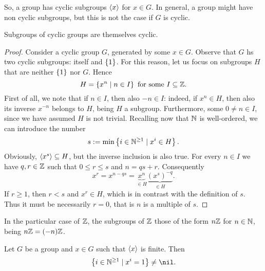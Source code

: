 
So, a group has cyclic subgroups \(\left\langle x\right\rangle\) for \(x \in G\). In general, a group might have non cyclic subgroups, but this is not the case if \(G\) is cyclic.

\begin{proposition}\label{prop:SubgroupsOfCyclicGroupsAreCyclic}
Subgroups of cyclic groups are themselves cyclic.
\end{proposition}

\begin{proof}
Consider a cyclic group \(G\), generated by some \(x \in G\). Observe that \(G\) hs two cyclic subgroups: itself and \(\left\{1\right\}\). For this reason, let us focus on subgroups \(H\) that are neither \(\left\{1\right\}\) nor \(G\). Hence
\[H = \left\{x^n \mid n \in I\right\} \text{ for some } I \subseteq \mathbb Z .\]
First of all, we note that if \(n \in I\), then also \(-n \in I\): indeed, if \(x^n \in H\), then also its inverse \(x^{-n}\) belongs to \(H\), being \(H\) a subgroup. Furthermore, some \(0 \ne n \in I\), since we have assumed \(H\) is not trivial. Recalling now that \(\mathbb N\) is well-ordered, we can introduce the number
\[s := \min \left\{i \in \mathbb N^{\ge 1} \mid x^i \in H\right\} .\]
Obviously, \(\left\langle x^s\right\rangle \subseteq H\), but the inverse inclusion is also true. For every \(n \in I\) we have \(q, r \in \mathbb Z\) such that \(0 \le r \le s\) and \(n =qs +r\). Consequently
\[x^r = x^{n-qs} = \underbrace{x^n}_{\in H} \underbrace{(x^s)^{-q}}_{\in H} .\]
If \(r \ge 1\), then \(r < s\) and \(x^r \in H\), which is in contrast with the definition of \(s\). Thus it must be necessarily \(r = 0\), that is \(n\) is a multiple of \(s\).
\end{proof}

In the particular case of \(\mathbb Z\), the subgroups of \(\mathbb Z\) those of the form \(n \mathbb Z\) for \(n \in \mathbb N\), being \(n \mathbb Z = (-n)\mathbb Z\).

\begin{lemma}Let \(G\) be a group and \(x \in G\) such that \(\left\langle x\right\rangle\) is finite. Then
\[\set{i \in \nn^{\ge 1} \mid x^i = 1} \ne \nil.\]
\end{lemma}

